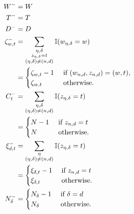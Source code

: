 \begin{align}
    W^-             &= W \\
    T^-             &= T \\
    D^-             &= D \\
    \zeta_{w, t}^-  &= \sum_{\substack{\eta, \delta \\ z_{\eta, \delta} = t \\ (\eta, \delta) \neq (n, d)}} \operatorname{\mathbb I}(w_{\eta, \delta} = w) \\
                    &=
                        \begin{cases}
                            \zeta_{w, t} - 1    & \text{ if $(w_{n, d}, z_{n, d}) = (w, t)$,} \\
                            \zeta_{w, t}        & \text{ otherwise}.
                        \end{cases} \\
    C_t^-           &= \sum_{\substack{\eta, \delta \\ (\eta, \delta) \neq (n, d)}} \operatorname{\mathbb I}(z_{\eta, \delta} = t) \\ 
                    &=
                        \begin{cases}
                            N - 1   & \text{ if $z_{n, d} = t$} \\
                            N       & \text{ otherwise}.
                        \end{cases} \\
    \xi_{d,t}^-     &= \sum_{\substack{\eta \\ (\eta, \delta) \neq (n, d)}} \operatorname{\mathbb I}(z_{\eta, \delta} = t) \\
                    &= 
                        \begin{cases}
                            \xi_{\delta, t} - 1     & \text{ if $z_{n, d} = t$} \\
                            \xi_{\delta, t}         & \text{ otherwise.}
                        \end{cases} \\
    N_{\delta}^-    &=
                        \begin{cases}
                            N_{\delta} - 1      & \text{ if $\delta = d$} \\
                            N_{\delta}          & \text{ otherwise.}
                        \end{cases}
\end{align}

